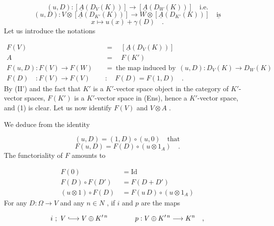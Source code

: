 \begin{equation*}
(u, D) : [\underline{A}(D_{V}(K))] \rightarrow [\underline{A}(D_{W}(K))] \quad \text{i.e.}
\end{equation*}
\begin{equation*}
(u, D) : V \otimes [\underline{A}(D_{K'}(K))] \rightarrow W \otimes [\underline{A}(D_{K'}(K))] \quad \underline{\text{is}}
\end{equation*}
\begin{equation*}
x \longmapsto u(x) + \gamma(D) \quad .
\end{equation*}
Let us introduce the notations

\begin{equation*}
\begin{aligned}
F(V) \quad &= \quad [\underline{A}(D_{V}(K))] \\
A \quad &= \quad F(K') \\
F(u,D) : F(V) \rightarrow F(W) \quad &= \ \text{the map induced by} \ \ (u,D) : D_{V}(K) \rightarrow D_{W}(K) \\
F(D) \quad : F(V) \rightarrow F(V) \quad &: \quad F(D) = F(1, D) \quad .
\end{aligned}
\end{equation*}
By (II') and the fact that  $K'$  is a  $K'$-vector space object in the category of $K'$-vector spaces,  $F(K')$  is a  $K'$-vector space in (Ens), hence a  $K'$-vector space, and (1) is clear. Let us now identify  $F(V)$  and  $V \otimes A$  .

We deduce from the identity

\begin{equation*}
(u, D) = (1, D) \circ (u, 0) \quad \text{that}
\end{equation*}
\begin{equation*}
F(u, D) = F(D) \circ (u \otimes 1_{A}) \quad .
\end{equation*}
The functoriality of  $F$  amounts to

\begin{equation*}
\begin{aligned}
F(0) &= \mathrm{Id} \\
F(D) \circ F(D') &= F(D + D') \\
(u \otimes 1) \circ F(D) \ &= F(u\,D) \circ (u \otimes 1_{A})
\end{aligned}
\end{equation*}
For any  $D : \Omega \rightarrow V$  and any  $n \in N$  , if  $i$  and  $p$  are the maps

\begin{equation*}
i \ ; \ V \lhook\joinrel\longrightarrow V \oplus K'^{\,n} \qquad\qquad p : V \oplus K'^{\,n} \longrightarrow K^{n} \quad , 
\end{equation*}



